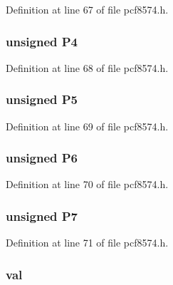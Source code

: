 Definition at line 67 of file pcf8574.\-h.

\hypertarget{union_p_c_f8574__t_a09320e8d5a61c57aa3557d0d5f307944}{
\subsubsection[{P4}]{\setlength{\rightskip}{0pt plus 5cm}unsigned P4}}\label{union_p_c_f8574__t_a09320e8d5a61c57aa3557d0d5f307944}


Definition at line 68 of file pcf8574.\-h.

\hypertarget{union_p_c_f8574__t_ad6df7c6a81cde10e7e95738e30e099e9}{
\subsubsection[{P5}]{\setlength{\rightskip}{0pt plus 5cm}unsigned P5}}\label{union_p_c_f8574__t_ad6df7c6a81cde10e7e95738e30e099e9}


Definition at line 69 of file pcf8574.\-h.

\hypertarget{union_p_c_f8574__t_a058a2e3f96a00e0849823e77872d8fcb}{
\subsubsection[{P6}]{\setlength{\rightskip}{0pt plus 5cm}unsigned P6}}\label{union_p_c_f8574__t_a058a2e3f96a00e0849823e77872d8fcb}


Definition at line 70 of file pcf8574.\-h.

\hypertarget{union_p_c_f8574__t_af18908c2fbc85cadea0f256b17c63845}{
\subsubsection[{P7}]{\setlength{\rightskip}{0pt plus 5cm}unsigned P7}}\label{union_p_c_f8574__t_af18908c2fbc85cadea0f256b17c63845}


Definition at line 71 of file pcf8574.\-h.

\hypertarget{union_p_c_f8574__t_a5d0cde7a426451812b691b5ae4a01560}{
\subsubsection[{val}]{ val}}\label{union_p_c_f8574__t_a5d0cde7a426451812b691b5ae4a01560}


